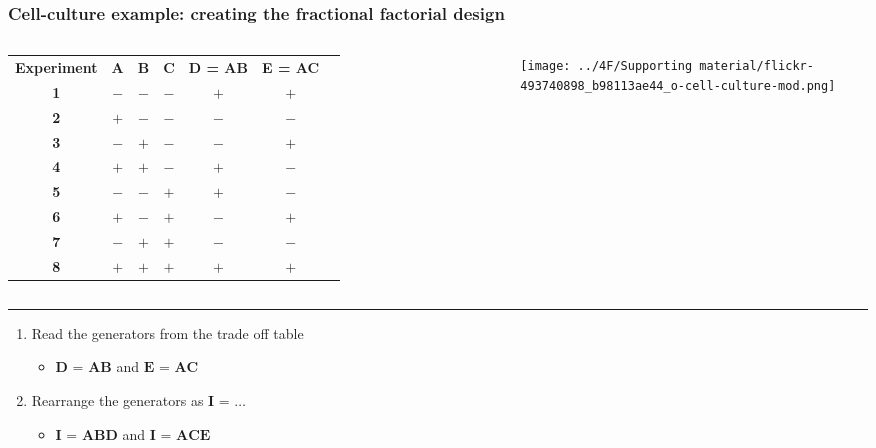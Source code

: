 \begin{frame}\frametitle{Cell-culture example: creating the fractional factorial design}
	
	\vspace{0.5cm}
	\begin{columns}[T]
			{\scriptsize
				\begin{tabulary}{\linewidth}{ccccccc}
					\textbf{\relax Experiment} & \textbf{\relax A } & \textbf{\relax B} & \textbf{\relax C } & \textbf{\relax D = AB} & \textbf{\relax E = AC}\\ 
					\textbf{1} & \(-\) & \(-\) & \(-\) & \(+\) & \(+\) \\
					\textbf{2} & \(+\) & \(-\) & \(-\) & \(-\) & \(-\) \\
					\textbf{3} & \(-\) & \(+\) & \(-\) & \(-\) & \(+\) \\
					\textbf{4} & \(+\) & \(+\) & \(-\) & \(+\) & \(-\) \\
					\textbf{5} & \(-\) & \(-\) & \(+\) & \(+\) & \(-\) \\
					\textbf{6} & \(+\) & \(-\) & \(+\) & \(-\) & \(+\) \\
					\textbf{7} & \(-\) & \(+\) & \(+\) & \(-\) & \(-\) \\
					\textbf{8} & \(+\) & \(+\) & \(+\) & \(+\) & \(+\) \\
				\end{tabulary}
			}
		
			\vspace{-0.2cm}
			\centerline{\texttt{[image: ../4F/Supporting material/flickr-493740898\_b98113ae44\_o-cell-culture-mod.png]} }
			
	\end{columns}
	
	\vspace{0.2cm}
	\hrule
	\begin{enumerate}
		\item	Read the generators from the trade off table 
			\begin{itemize}
				\item		$\textbf{D = AB}$  and $\textbf{E = AC}$ 
			\end{itemize}
		
		\item	Rearrange the generators as  $\textbf{I = \ldots}$
			\begin{itemize}
				\item	$\textbf{I = ABD}$ and $\textbf{I = ACE}$ 
			\end{itemize}
			

\end{enumerate}
\end{frame}
